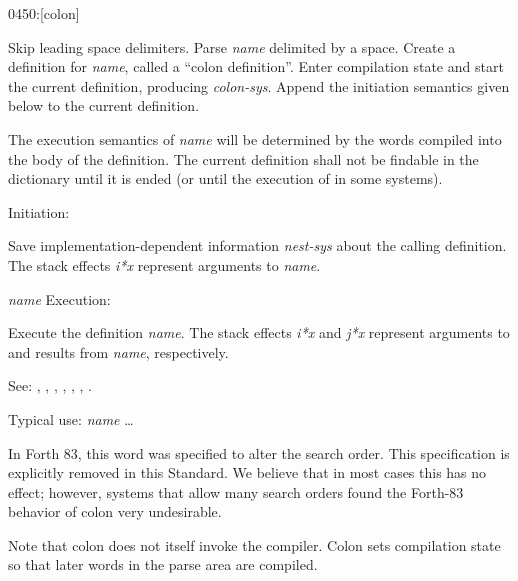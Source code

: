 \begin{newword}{0450}{:}[colon]

	Skip leading space delimiters. Parse \emph{name} delimited by a
	space. Create a definition for \emph{name}, called a ``colon
	definition''. Enter compilation state and start the current
	definition, producing \emph{colon-sys}. Append the initiation
	semantics given below to the current definition.

	The execution semantics of \emph{name} will be determined by the
	words compiled into the body of the definition. The current
	definition shall not be findable in the dictionary until it is
	ended (or until the execution of  in some systems).

\item[Initiation:]

	Save implementation-dependent information \emph{nest-sys} about
	the calling definition. The stack effects \emph{i*x} represent
	arguments to \emph{name}.

\item[\emph{name} Execution:]
	~

	Execute the definition \emph{name}. The stack effects \emph{i*x}
	and \emph{j*x} represent arguments to and results from
	\emph{name}, respectively.

\item[See:]
	,
	,
	,
	,
	\wref{core:[}{[},
	\wref{core:]}{]},
	.

	\begin{rationale} %
		Typical use:
			\word{:} \emph{name} {\ldots} \word{;}

		In Forth 83, this word was specified to alter the search order.
		This specification is explicitly removed in this Standard. We
		believe that in most cases this has no effect; however, systems
		that allow many search orders found the Forth-83 behavior of
		colon very undesirable.

		Note that colon does not itself invoke the compiler. Colon sets
		compilation state so that later words in the parse area are
		compiled.
	\end{rationale}
\end{newword}



